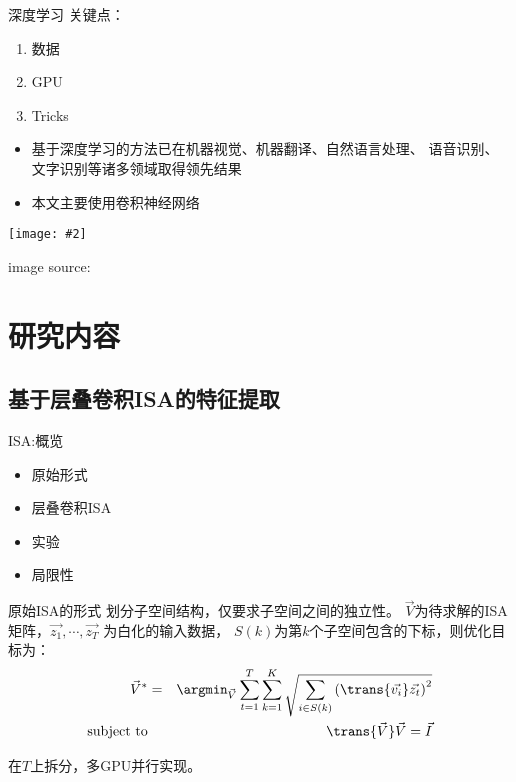\documentclass {beamer}
\newcommand{\addgraph}[2]{\begin{center}
\texttt{[image: \#2]}\end{center}}
\begin{document}
\begin{frame}{深度学习}
    关键点：
    \begin{enumerate}
        \item 数据
        \item GPU
        \item Tricks
    \end{enumerate}
    \pause
    \begin{itemize}
        \item 基于深度学习的方法已在机器视觉、机器翻译、自然语言处理、
            语音识别、文字识别等诸多领域取得领先结果
        \item 本文主要使用卷积神经网络
    \end{itemize}
    \addgraph{0.5}{res/alexnet.png}
    \tiny{image source: \cite{krizhevsky2012imagenet}}
\end{frame}


\section{研究内容}
\subsection{基于层叠卷积ISA的特征提取}
\begin{frame}{ISA:概览}
    \begin{itemize}
        \item 原始形式
        \item 层叠卷积ISA
        \item 实验
        \item 局限性
    \end{itemize}
\end{frame}

\begin{frame}{原始ISA的形式}
    划分子空间结构，仅要求子空间之间的独立性。
    $\vec{V}$为待求解的ISA矩阵，$\vec{z_1},\cdots,\vec{z_T}$
    为\alert{白化}的输入数据，
    $S(k)$为第$k$个子空间包含的下标，则优化目标为：
    \begin{eqnarray}
        \vec{V}^* &=& \argmin_{\vec{V}} \sum_{t=1}^T \sum_{k=1}^K
        \sqrt{\sum_{i\in S(k)}\left(\trans{\vec{v_i}}\vec{z_t}\right)^2}
        \nonumber \\
        \text{subject to} && \trans{\vec{V}}\vec{V}=\vec{I}
        \label{eqn:isa:1}
    \end{eqnarray}


     {
        \vspace{1em}
        在$T$上拆分，多GPU\alert{并行实现}。
    }
\end{frame}
\end{document}
